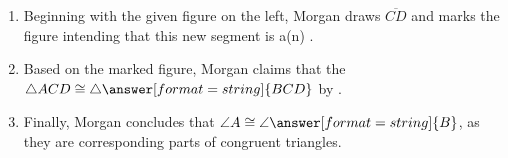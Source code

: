 \documentclass[nooutcomes]{ximera}
\begin{document}
\begin{problem}
\begin{enumerate}
\item Beginning with the given figure on the left, Morgan draws $\overline{CD}$ and marks the figure intending that this new segment is a(n) .

\item Based on the marked figure, Morgan claims that the $\triangle ACD\cong \triangle\answer[format=string]{BCD}$ by . 

\item Finally, Morgan concludes that $\angle A\cong \angle\answer[format=string]{B}$, as they are corresponding parts of congruent triangles. 
\end{enumerate}

\end{problem}
\end{document}
